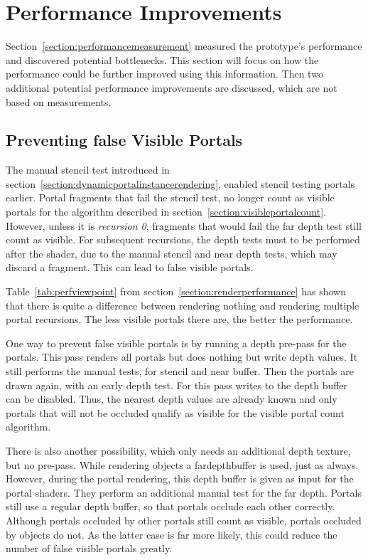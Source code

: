 \chapter{Performance Improvements}
\label{section:performanceimprovements}

Section~\ref{section:performancemeasurement} measured the prototype's performance and discovered potential bottlenecks. This section will focus on how the performance could be further improved using this information. Then two additional potential performance improvements are discussed, which are not based on measurements.

\section{Preventing false Visible Portals}
\label{section:falsevisible}
The manual stencil test introduced in section~\ref{section:dynamicportalinstancerendering}, enabled stencil testing portals earlier. Portal fragments that fail the stencil test, no longer count as visible portals for the algorithm described in section~\ref{section:visibleportalcount}. However, unless it is \textit{recursion 0}, fragments that would fail the far depth test still count as visible. For subsequent recursions, the depth tests must to be performed after the shader, due to the manual stencil and near depth tests, which may discard a fragment. This can lead to false visible portals.

Table~\ref{tab:perfviewpoint} from section~\ref{section:renderperformance} has shown that there is quite a difference between rendering nothing and rendering multiple portal recursions. The less visible portals there are, the better the performance.

One way to prevent false visible portals is by running a depth pre-pass for the portals. This pass renders all portals but does nothing but write depth values. It still performs the manual tests, for stencil and near buffer. Then the portals are drawn again, with an early depth test. For this pass writes to the depth buffer can be disabled. Thus, the nearest depth values are already known and only portals that will not be occluded qualify as visible for the visible portal count algorithm.

There is also another possibility, which only needs an additional depth texture, but no pre-pass. While rendering objects a \gls{fardepthbuffer} is used, just as always. However, during the portal rendering, this depth buffer is given as input for the portal shaders. They perform an additional manual test for the far depth. Portals still use a regular depth buffer, so that portals occlude each other correctly. Although portals occluded by other portals still count as visible, portals occluded by objects do not. As the latter case is far more likely, this could reduce the number of false visible portals greatly.

